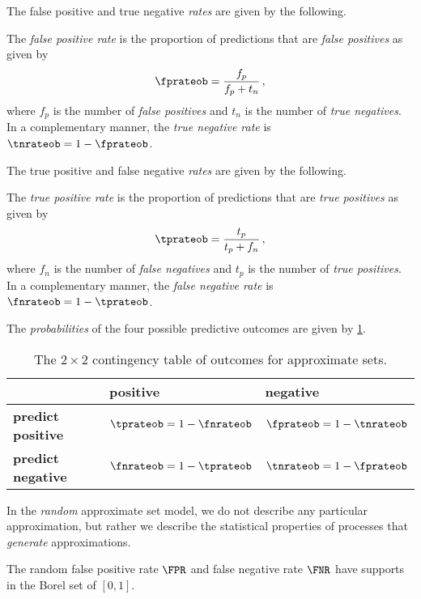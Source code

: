 \documentclass[ ../main.tex]{subfiles}
\begin{document}
The false positive and true negative \emph{rates} are given by the following.
\begin{definition}
\label{def:fprate}
The \emph{false positive rate} is the proportion of predictions that are \emph{false positives} as given by
\begin{equation}
     \fprateob = \frac{f_p}{f_p + t_n}\,,
\end{equation}
where $f_p$ is the number of \emph{false positives} and $t_n$ is the number of  \emph{true negatives}.
In a complementary manner, the \emph{true negative rate} is $\tnrateob = 1 - \fprateob$.
\end{definition}

The true positive and false negative \emph{rates} are given by the following.
\begin{definition}
The \emph{true positive rate} is the proportion of predictions that are \emph{true positives} as given by
\begin{equation}
\tprateob = \frac{t_p}{t_p + f_n}\,,
\end{equation}
where $f_n$ is the number of \emph{false negatives} and $t_p$ is the number of \emph{true positives}.
In a complementary manner, the \emph{false negative rate} is $\fnrateob = 1 - \tprateob$.
\end{definition}

The \emph{probabilities} of the four possible predictive outcomes are given by 
\cref{tbl:contingency_table}.
\begin{table}[ht]
\centering
\begin{tabular}{@{} l l l @{}}
    \toprule
    & \textbf{positive} & \textbf{negative}\\
    \midrule
    \textbf{predict positive} & $\tprateob=1-\fnrateob$ & 
    $\fprateob=1-\tnrateob$\\
    \textbf{predict negative} & $\fnrateob=1-\tprateob$ & 
    $\tnrateob=1-\fprateob$\\
    \bottomrule
\end{tabular}
\caption{The $2 \times 2$ contingency table of outcomes for approximate sets.}
\label{tbl:contingency_table}        
\end{table}

In the \emph{random} approximate set model, we do not describe any particular approximation, but rather we describe the statistical properties of 
processes that \emph{generate} approximations.

The random false positive rate $\FPR$ and false negative rate $\FNR$ have supports in the Borel set of $[0,1]$.
\end{document}
